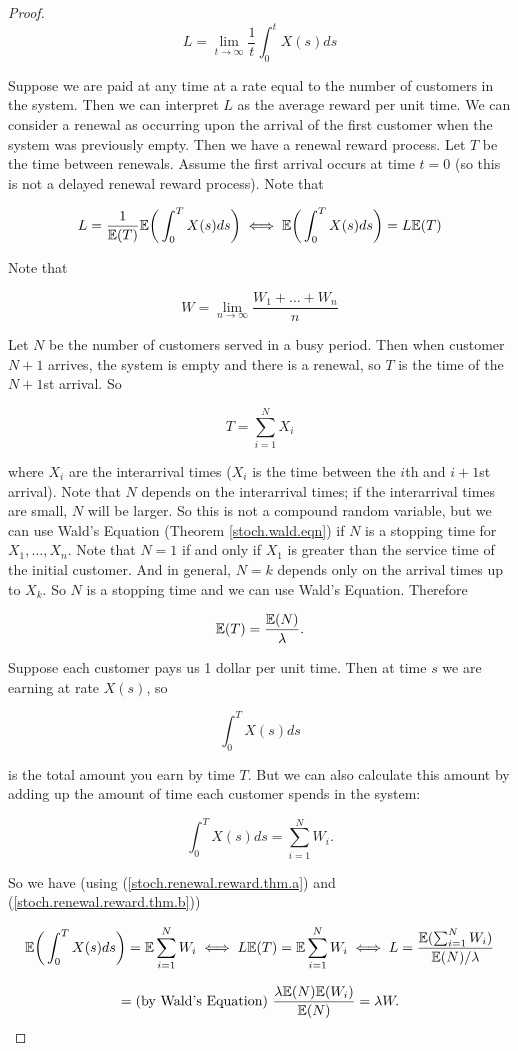 \begin{proof}

\[
L = \lim_{t \to \infty} \frac{1}{t} \int_0^t X(s) ds
\]

Suppose we are paid at any time at a rate equal to the number of customers in the system. Then we can interpret \(L\) as the average reward per unit time. We can consider a renewal as occurring upon the arrival of the first customer when the system was previously empty. Then we have a renewal reward process. Let \(T\) be the time between renewals. Assume the first arrival occurs at time \(t=0\) (so this is not a delayed renewal reward process). Note that

\begin{equation}\label{stoch.renewal.reward.thm.a}
L =  \frac{1}{\E (T)} \E \bigg( \int_0^T X(s) ds \bigg) \iff   \E \bigg( \int_0^T X(s) ds \bigg)  = L \E(T)
\end{equation}

Note that

\[
W = \lim_{n \to \infty} \frac{W_1 + \ldots + W_n}{n}
\]

Let \(N\) be the number of customers served in a busy period. Then when customer \(N+1\) arrives, the system is empty and there is a renewal, so \(T\) is the time of the \(N+1\)st arrival. So

\[
T = \sum_{i=1}^N X_i
\]

where \(X_i\) are the interarrival times (\(X_i\) is the time between the \(i\)th and \(i + 1\)st arrival). Note that \(N\) depends on the interarrival times; if the interarrival times are small, \(N\) will be larger. So this is not a compound random variable, but we can use Wald's Equation (Theorem \ref{stoch.wald.eqn}) if \(N\) is a stopping time for \(X_1, \ldots, X_n\). Note that \(N= 1\) if and only if \(X_1\) is greater than the service time of the initial customer. And in general, \(N=k\) depends only on the arrival times up to \(X_k\). So \(N\) is a stopping time and we can use Wald's Equation. Therefore

\begin{equation}\label{stoch.renewal.reward.thm.b}
\E(T) = \frac{\E(N)}{\lambda}.
\end{equation}

Suppose each customer pays us 1 dollar per unit time. Then at time \(s\) we are earning at rate \(X(s)\), so 

\[
\int_0^T X(s) ds
\]

is the total amount you earn by time \(T\). But we can also calculate this amount by adding up the amount of time each customer spends in the system:

\[
\int_0^T X(s) ds = \sum_{i=1}^N W_i.
\]

So we have (using (\ref{stoch.renewal.reward.thm.a}) and (\ref{stoch.renewal.reward.thm.b}))

\[
\E \bigg( \int_0^T X(s) ds \bigg) =  \E \sum_{i=1}^N W_i  \iff L \E(T) =   \E \sum_{i=1}^N W_i   \iff L = \frac{ \E( \sum_{i=1}^N W_i) }{\E(N)/\lambda}  
\]

\[
= \text{(by Wald's Equation) }\frac{ \lambda \E(N) \E (W_i) }{\E(N)} = \lambda W.
\]


\end{proof}


